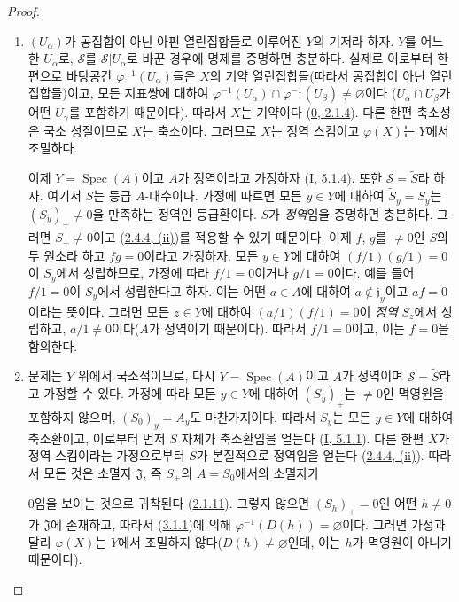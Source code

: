 \begin{proof}
\begin{enumerate}
  \item[\rm(i)] $(U_\alpha)$가 공집합이 아닌 아핀 열린집합들로 이루어진
    $Y$의 기저라 하자. $Y$를 어느 한 $U_\alpha$로, $\mathcal{S}$를
    $\mathcal{S}|U_\alpha$로 바꾼 경우에 명제를 증명하면 충분하다.
    실제로 이로부터 한편으로 바탕공간 $\varphi^{-1}(U_\alpha)$들은
    $X$의 기약 열린집합들(따라서 공집합이 아닌 열린집합들)이고, 모든
    지표쌍에 대하여
    $\varphi^{-1}(U_\alpha)\cap\varphi^{-1}(U_\beta)\neq\varnothing$이다
    ($U_\alpha\cap U_\beta$가 어떤 $U_\gamma$를 포함하기 때문이다).
    따라서 $X$는 기약이다 (\hyperref[0.2.1.4-ko]{0, 2.1.4}). 다른 한편
    축소성은 국소 성질이므로 $X$는 축소이다. 그러므로 $X$는 정역
    스킴이고 $\varphi(X)$는 $Y$에서 조밀하다.

    이제 $Y=\operatorname{Spec}(A)$이고 $A$가 정역이라고 가정하자
    (\hyperref[I.5.1.4-ko]{I, 5.1.4}). 또한 $\mathcal{S}=\widetilde{S}$라
    하자. 여기서 $S$는 등급 $A$-대수이다. 가정에 따르면 모든 $y\in Y$에
    대하여 $\widetilde{S}_y=S_y$는 $(S_y)_+\neq0$을 만족하는 정역인
    등급환이다. $S$가 \emph{정역}임을 증명하면 충분하다. 그러면
    $S_+\neq0$이고 (\hyperref[II.2.4.4-ko]{2.4.4, (ii)})를 적용할 수 있기
    때문이다. 이제 $f$, $g$를 $\neq0$인 $S$의 두 원소라 하고
    $fg=0$이라고 가정하자. 모든 $y\in Y$에 대하여
    $(f/1)(g/1)=0$이 $S_y$에서 성립하므로, 가정에 따라 $f/1=0$이거나
    $g/1=0$이다. 예를 들어 $f/1=0$이 $S_y$에서 성립한다고 하자. 이는
    어떤 $a\in A$에 대하여 $a\notin\mathfrak{j}_y$이고 $af=0$이라는
    뜻이다. 그러면 모든 $z\in Y$에 대하여 $(a/1)(f/1)=0$이 \emph{정역}
    $S_z$에서 성립하고, $a/1\neq0$이다($A$가 정역이기 때문이다).
    따라서 $f/1=0$이고, 이는 $f=0$을 함의한다.
  \item[\rm(ii)] 문제는 $Y$ 위에서 국소적이므로, 다시
    $Y=\operatorname{Spec}(A)$이고 $A$가 정역이며
    $\mathcal{S}=\widetilde{S}$라고 가정할 수 있다. 가정에 따라 모든
    $y\in Y$에 대하여 $(S_y)_+$는 $\neq0$인 멱영원을 포함하지 않으며,
    $(S_0)_y=A_y$도 마찬가지이다. 따라서 $S_y$는 모든 $y\in Y$에
    대하여 축소환이고, 이로부터 먼저 $S$ 자체가 축소환임을 얻는다
    (\hyperref[I.5.1.1-ko]{I, 5.1.1}). 다른 한편 $X$가 정역 스킴이라는
    가정으로부터 $S$가 본질적으로 정역임을 얻는다
    (\hyperref[II.2.4.4-ko]{2.4.4, (ii)}). 따라서 모든 것은 소멸자
    $\mathfrak{J}$, 즉 $S_+$의 $A=S_0$에서의 소멸자가


    $0$임을 보이는 것으로 귀착된다
    (\hyperref[II.2.1.11-ko]{2.1.11}). 그렇지 않으면
    $(S_h)_+=0$인 어떤 $h\neq0$가 $\mathfrak{J}$에 존재하고, 따라서
    (\hyperref[II.3.1.1-ko]{3.1.1})에 의해
    $\varphi^{-1}(D(h))=\varnothing$이다. 그러면 가정과 달리
    $\varphi(X)$는 $Y$에서 조밀하지 않다($D(h)\neq\varnothing$인데,
    이는 $h$가 멱영원이 아니기 때문이다).
\end{enumerate}
\end{proof}

